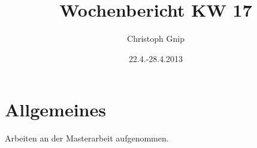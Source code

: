 ﻿\documentclass[a4paper,12pt,fleqn]{scrartcl}
\title{Wochenbericht KW 17}
\author{Christoph Gnip}
\date{ 22.4.-28.4.2013 }
\begin{document}
\setlength{\headheight}{36pt}
\begin{titlepage}

\maketitle

\thispagestyle{empty}



\end{titlepage}
\section[Allgemeines]{Allgemeines}
Arbeiten an der Masterarbeit aufgenommen.
\end{document}
